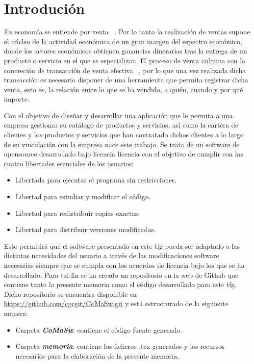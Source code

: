 \chapter{Introdución}
\label{chap:introducion}


\lettrine{E}{n} economía se entiende por venta ~\cite{ventas}. Por lo tanto la realización de ventas supone el núcleo de la actividad económica de un gran margen del espectro económico, donde los actores económicos obtienen ganancias dinerarias tras la entrega de un producto o servicio en el que se especializan. El proceso de venta culmina con la concreción de transacción de venta efectiva ~\cite{proceso-venta}, por lo que una vez realizada dicha transacción es necesario disponer de una herramienta que permita registrar dicha venta, esto es, la relación entre lo que se ha vendido, a quién, cuando y por qué importe.

Con el objetivo de diseñar y desarrollar una aplicación que le permita a una empresa gestionar su catálogo de productos y servicios, así como la cartera de clientes y los productos y servicios que han contratado dichos clientes a lo largo de su vinculación con la empresa nace este trabajo. Se trata de un software de \gls{opensource} desarrollado bajo licencia \acrfull{licencia} con el objetivo de cumplir con las cuatro libertades esenciales de los usuarios:
\begin{itemize}
\item Libertada para ejecutar el programa sin restricciones.
\item Libertad para estudiar y modificar el código.
\item Libertad para redistribuir copias exactas.
\item Libertad para distribuir versiones modificadas.
\end{itemize}

Esto permitirá que el software presentado en este \acrfull{tfg} pueda ser adaptado a las distintas necesidades del usuario a través de las modificaciones software necesarias siempre que se cumpla con los acuerdos de licencia bajo los que se ha desarrollado. Para tal fin se ha creado un repositorio en la web de Github que contiene tanto la presente memoria como el código desarrollado para este \acrshort{tfg}. Dicho repositorio se encuentra disponible en \url{https://github.com/cgcgit/CoMaSw.git} y está estructurado de la siguiente manera:
\begin{itemize}
\item Carpeta \emph{\textbf{CoMaSw}}: contiene el código fuente generado.
\item Carpeta \emph{\textbf{memoria}}: contiene los ficheros .tex generados y los recursos necesarios para la elaboración de la presente memoria.
\end{itemize}

